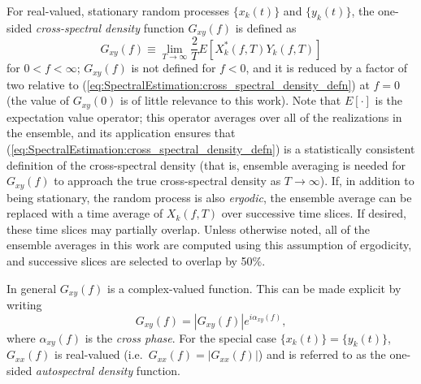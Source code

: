 For real-valued, stationary random processes $\{x_k(t)\}$ and $\{y_k(t)\}$,
the one-sided \emph{cross-spectral density} function $G_{xy}(f)$ is defined as
\begin{equation}
  G_{xy}(f)
  \equiv
  \lim_{T \rightarrow \infty}
  \frac{2}{T} E \left[ X_k^*(f, T) Y_k(f, T) \right]
  \label{eq:SpectralEstimation:cross_spectral_density_defn}
\end{equation}
for $0 < f < \infty$;
$G_{xy}(f)$ is not defined for $f < 0$, and
it is reduced by a factor of two relative to
(\ref{eq:SpectralEstimation:cross_spectral_density_defn}) at $f = 0$
(the value of $G_{xy}(0)$ is of little relevance to this work).
Note that $E[\cdot]$ is the expectation value operator;
this operator averages over all of the realizations in the ensemble, and
its application ensures that
(\ref{eq:SpectralEstimation:cross_spectral_density_defn})
is a statistically consistent definition of the cross-spectral density
(that is, ensemble averaging is needed for $G_{xy}(f)$
to approach the true cross-spectral density
as $T \rightarrow \infty$). %
If, in addition to being stationary,
the random process is also \emph{ergodic},
the ensemble average can be replaced
with a time average of $X_k(f, T)$
over successive time slices.
If desired, these time slices may partially overlap.
Unless otherwise noted,
all of the ensemble averages in this work are computed
using this assumption of ergodicity, and
successive slices are selected to overlap by 50\%.

In general $G_{xy}(f)$ is a complex-valued function.
This can be made explicit by writing
\begin{equation}
  G_{xy}(f) = \left| G_{xy}(f) \right| e^{i \alpha_{xy}(f)},
  \label{eq:SpectralEstimation:cross_spectral_density_explicit_complex}
\end{equation}
where $\alpha_{xy}(f)$ is the \emph{cross phase}.
For the special case $\{x_k(t)\} = \{y_k(t)\}$,
$G_{xx}(f)$ is real-valued (i.e.\ $G_{xx}(f) = |G_{xx}(f)|$) and
is referred to as the one-sided \emph{autospectral density} function.

